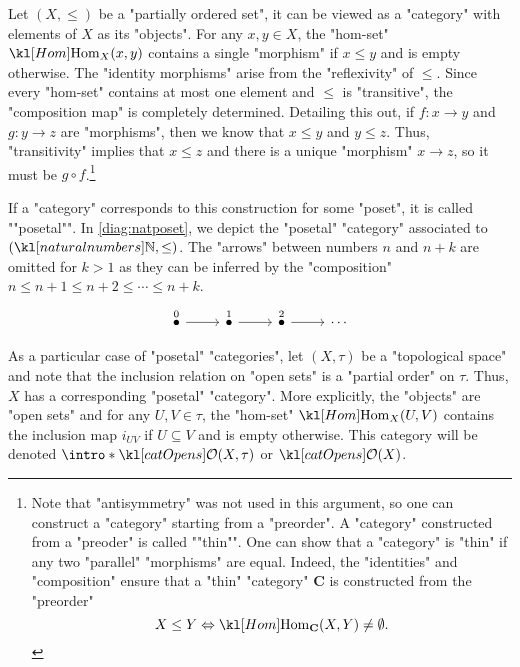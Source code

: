 \documentclass[main.tex]{subfiles}
\begin{document}
\begin{exmp}
	Let $(X, \leq)$ be a "partially ordered set", it can be viewed as a "category" with elements of $X$ as its "objects". For any $x,y \in X$, the "hom-set" $\Hom_X(x,y)$ contains a single "morphism" if $x \leq y$ and is empty otherwise. The "identity morphisms" arise from the "reflexivity" of $\leq$. Since every "hom-set" contains at most one element and $\leq$ is "transitive", the "composition map" is completely determined. Detailing this out, if $f:x \rightarrow y$ and $g: y \rightarrow z$ are "morphisms", then we know that $x \leq y$ and $y\leq z$. Thus, "transitivity" implies that $x\leq z$ and there is a unique "morphism" $x \rightarrow z$, so it must be $g \circ f$.\footnote{Note that "antisymmetry" was not used in this argument, so one can construct a "category" starting from a "preorder". \AP A "category" constructed from a "preoder" is called ""thin"". One can show that a "category" is "thin" if any two "parallel" "morphisms" are equal. Indeed, the "identities" and "composition" ensure that a "thin" "category" $\mathbf{C}$ is constructed from the "preorder" \[X \leq Y \Leftrightarrow \Hom_{\mathbf{C}}(X,Y) \neq \emptyset.\]}
	
	\AP If a "category" corresponds to this construction for some "poset", it is called ""posetal"". In \eqref{diag:natposet}, we depict the "posetal" "category" associated to $(\N, \leq)$. The "arrows" between numbers $n$ and $n+k$ are omitted for $k>1$ as they can be inferred by the "composition" $n \leq n+1 \leq n+2 \leq \cdots \leq n+k$.
	\begin{equation}\label{diag:natposet}
		\begin{tikzcd}
			\stackrel{0}{\bullet} \arrow[r] & \stackrel{1}{\bullet} \arrow[r] & \stackrel{2}{\bullet} \arrow[r] & \cdots
		\end{tikzcd}
	\end{equation}
	
	As a particular case of "posetal" "categories", let $(X, \tau)$ be a "topological space" and note that the inclusion relation on "open sets" is a "partial order" on $\tau$. Thus, $X$ has a corresponding "posetal" "category". More explicitly, the "objects" are "open sets" and for any $U, V \in \tau$, the "hom-set" $\Hom_X(U,V)$ contains the inclusion map $i_{UV}$ if $U\subseteq V$ and is empty otherwise. \AP This category will be denoted $\intro*\catOpens(X,\tau)$ or $\catOpens(X)$.
\end{exmp}
\end{document}
